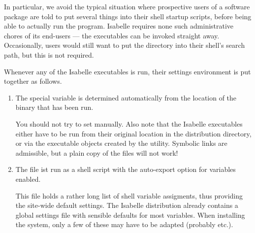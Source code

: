 \begin{isabellebody}
\begin{isamarkuptext}
  In particular, we avoid the typical situation where prospective
  users of a software package are told to put several things into
  their shell startup scripts, before being able to actually run the
  program. Isabelle requires none such administrative chores of its
  end-users --- the executables can be invoked straight away.
  Occasionally, users would still want to put the \hyperlink{file.$ISABELLE-HOME/bin}{\mbox{}} directory into their shell's search path, but
  this is not required.%
\end{isamarkuptext}%
\isamarkuptrue%
%
\isamarkuptrue%
%
\begin{isamarkuptext}%
Whenever any of the Isabelle executables is run, their settings
  environment is put together as follows.

  \begin{enumerate}

  \item The special variable \hypertarget{setting.ISABELLE-HOME}{\hyperlink{setting.ISABELLE-HOME}{\mbox{}}} is
  determined automatically from the location of the binary that has
  been run.
  
  You should not try to set \hyperlink{setting.ISABELLE-HOME}{\mbox{}} manually. Also
  note that the Isabelle executables either have to be run from their
  original location in the distribution directory, or via the
  executable objects created by the \hyperlink{tool.install}{\mbox{}} utility.  Symbolic
  links are admissible, but a plain copy of the \hyperlink{file.$ISABELLE-HOME/bin}{\mbox{}} files will not work!

  \item The file \hyperlink{file.$ISABELLE-HOME/etc/settings}{\mbox{}} ist run as a
  \hyperlink{executable.bash}{\mbox{}} shell script with the auto-export option for
  variables enabled.
  
  This file holds a rather long list of shell variable assigments,
  thus providing the site-wide default settings.  The Isabelle
  distribution already contains a global settings file with sensible
  defaults for most variables.  When installing the system, only a few
  of these may have to be adapted (probably \hyperlink{setting.ML-SYSTEM}{\mbox{}}
  etc.).
  

\end{enumerate}
\end{isamarkuptext}
\end{isabellebody}
